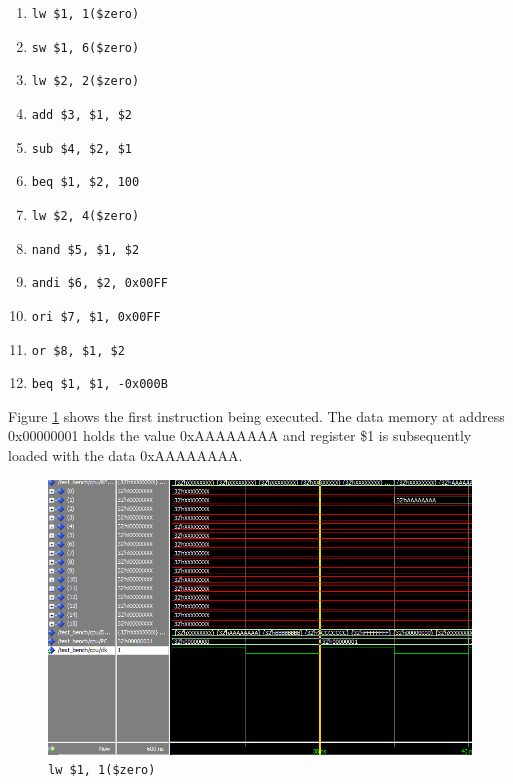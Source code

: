 \documentclass[12pt]{article}
\begin{document}
\begin{enumerate}
	\item \texttt{lw \$1, 1(\$zero)}
	\item \texttt{sw \$1, 6(\$zero)}
	\item \texttt{lw \$2, 2(\$zero)}
	\item \texttt{add \$3, \$1, \$2}
	\item \texttt{sub \$4, \$2, \$1}
	\item \texttt{beq \$1, \$2, 100}
	\item \texttt{lw \$2, 4(\$zero)}
	\item \texttt{nand \$5, \$1, \$2}
	\item \texttt{andi \$6, \$2, 0x00FF}
	\item \texttt{ori \$7, \$1, 0x00FF}
	\item \texttt{or \$8, \$1, \$2}
	\item \texttt{beq \$1, \$1, -0x000B}
\end{enumerate}

Figure \ref{fig:1-instr} shows the first instruction being executed. The data memory at address 0x00000001 holds the value 0xAAAAAAAA and register \$1 is subsequently loaded with the data 0xAAAAAAAA.
\begin{figure}[H]
\centering
\includegraphics[width=\linewidth]{simulation/1-instr}
\caption{\texttt{lw \$1, 1(\$zero)}}
\label{fig:1-instr}
\end{figure}
\end{document}
